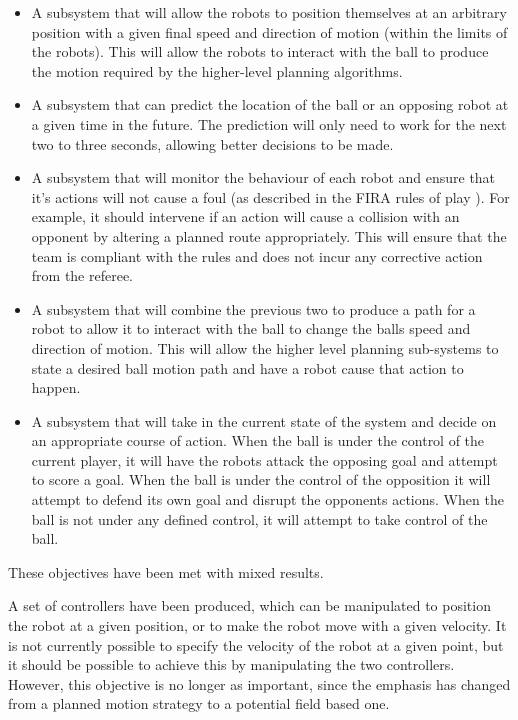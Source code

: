 \documentclass[10pt]{article}
\begin{document}
\begin{itemize}
\item A subsystem that will allow the robots to position themselves at an 
arbitrary position with a given final speed and direction of motion (within the
limits of the robots).  This will allow the robots to interact with the ball to 
produce the motion required by the higher-level planning algorithms.

\item A subsystem that can predict the location of the ball or an opposing robot 
at a given time in the future.  The prediction will only need to work for the 
next two to three seconds, allowing better decisions to be made.

\item A subsystem that will monitor the behaviour of each robot and ensure that 
it's actions will not cause a foul (as described in the FIRA rules of play 
\cite{simurosotSim}).  For example, it should intervene if an action will cause 
a collision with an opponent by altering a planned route appropriately.  This 
will ensure that the team is compliant with the rules and does not incur any 
corrective action from the referee.

\item A subsystem that will combine the previous two to produce a path for a 
robot to allow it to interact with the ball to change the balls speed and 
direction of motion.  This will allow the higher level planning sub-systems 
to state a desired ball motion path and have a robot cause that action to 
happen.

\item A subsystem that will take in the current state of the system and decide 
on an appropriate course of action. When the ball is under the control of the 
current player, it will have the robots attack the opposing goal and attempt to 
score a goal.  When the ball is under the control of the opposition it will 
attempt to defend its own goal and disrupt the opponents actions. When the ball 
is not under any defined control, it will attempt to take control of the ball.
\end{itemize}

\cite{pplr}

These objectives have been met with mixed results.

A set of controllers have been produced, which can be manipulated to position
the robot at a given position, or to make the robot move with a given velocity. 
It is not currently possible to specify the velocity of the robot at a given
point, but it should be possible to achieve this by manipulating the two
controllers.  However, this objective is no longer as important, since the
emphasis has changed from a planned motion strategy to a potential field based
one.
\end{document}
